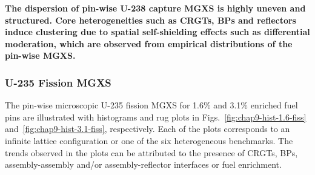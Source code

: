 
\begin{emphbox}
\textbf{The dispersion of pin-wise U-238 capture \ac{MGXS} is highly uneven and structured. Core heterogeneities such as \acp{CRGT}, \acp{BP} and reflectors induce clustering due to spatial self-shielding effects such as differential moderation, which are observed from empirical distributions of the pin-wise \ac{MGXS}.}
\end{emphbox}

\subsubsection{U-235 Fission MGXS}
\label{subsubsec:chap9-histograms-fiss}

The pin-wise microscopic U-235 fission \ac{MGXS} for 1.6\% and 3.1\% enriched fuel pins are illustrated with histograms and rug plots in Figs.~\ref{fig:chap9-hist-1.6-fiss} and~\ref{fig:chap9-hist-3.1-fiss}, respectively. Each of the plots corresponds to an infinite lattice configuration or one of the six heterogeneous benchmarks. The trends observed in the plots can be attributed to the presence of \acp{CRGT}, \acp{BP}, assembly-assembly and/or assembly-reflector interfaces or fuel enrichment. 

